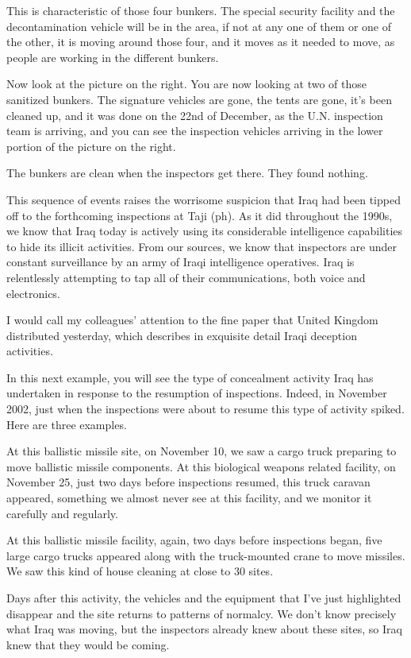 \documentclass[10pt,a4paper]{article}
\begin{document}
This is characteristic of those four bunkers. The special security facility and the decontamination vehicle will be in the area, if not at any one of them or one of the other, it is moving around those four, and it moves as it needed to move, as people are working in the different bunkers.

Now look at the picture on the right. You are now looking at two of those sanitized bunkers. The signature vehicles are gone, the tents are gone, it's been cleaned up, and it was done on the 22nd of December, as the U.N. inspection team is arriving, and you can see the inspection vehicles arriving in the lower portion of the picture on the right.

The bunkers are clean when the inspectors get there. They found nothing.

This sequence of events raises the worrisome suspicion that Iraq had been tipped off to the forthcoming inspections at Taji (ph). As it did throughout the 1990s, we know that Iraq today is actively using its considerable intelligence capabilities to hide its illicit activities. From our sources, we know that inspectors are under constant surveillance by an army of Iraqi intelligence operatives. Iraq is relentlessly attempting to tap all of their communications, both voice and electronics.

I would call my colleagues' attention to the fine paper that United Kingdom distributed yesterday, which describes in exquisite detail Iraqi deception activities.

In this next example, you will see the type of concealment activity Iraq has undertaken in response to the resumption of inspections. Indeed, in November 2002, just when the inspections were about to resume this type of activity spiked. Here are three examples.

At this ballistic missile site, on November 10, we saw a cargo truck preparing to move ballistic missile components. At this biological weapons related facility, on November 25, just two days before inspections resumed, this truck caravan appeared, something we almost never see at this facility, and we monitor it carefully and regularly.

At this ballistic missile facility, again, two days before inspections began, five large cargo trucks appeared along with the truck-mounted crane to move missiles. We saw this kind of house cleaning at close to 30 sites.

Days after this activity, the vehicles and the equipment that I've just highlighted disappear and the site returns to patterns of normalcy. We don't know precisely what Iraq was moving, but the inspectors already knew about these sites, so Iraq knew that they would be coming.
\end{document}

